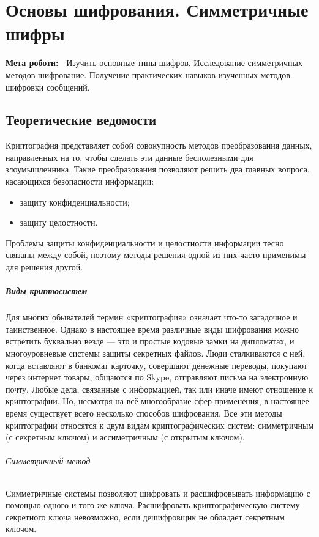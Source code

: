 \chapter{Основы шифрования. Симметричные шифры} \label{chapt1}%
\textbf{Мета роботи:~}%
Изучить основные типы шифров. Исследование симметричных методов шифрование.
Получение практических навыков изученных методов шифровки сообщений.

\section{Теоретические ведомости} \label{sect1_a}
%
Криптография представляет собой совокупность методов преобразования данных,
направленных на то, чтобы сделать эти данные бесполезными для злоумышленника.
Такие преобразования позволяют решить два главных вопроса, касающихся
безопасности информации:
\begin{itemize}
  \item защиту конфиденциальности;
  \item защиту целостности.
\end{itemize}

Проблемы защиты конфиденциальности и целостности информации тесно связаны
между собой, поэтому методы решения одной из них часто применимы для решения
другой. %

\paragraph{Виды криптосистем}%
Для многих обывателей термин «криптография» означает что-то загадочное и
таинственное. Однако в настоящее время различные виды шифрования можно
встретить буквально везде — это и простые кодовые замки на дипломатах, и
многоуровневые системы защиты секретных файлов. Люди сталкиваются с ней,
когда вставляют в банкомат карточку, совершают денежные переводы, покупают
через интернет товары, общаются по Skype, отправляют письма на электронную
почту. Любые дела, связанные с информацией, так или иначе имеют отношение к
криптографии. Но, несмотря на всё многообразие сфер применения, в настоящее
время существует всего несколько способов шифрования. Все эти методы
криптографии относятся к двум видам криптографических систем: симметричным (с
секретным ключом) и ассиметричным (с открытым ключом).
\subparagraph{Симметричный метод} %
Симметричные системы позволяют шифровать и расшифровывать информацию с
помощью одного и того же ключа. Расшифровать криптографическую систему
секретного ключа невозможно, если дешифровщик не обладает секретным ключом.

